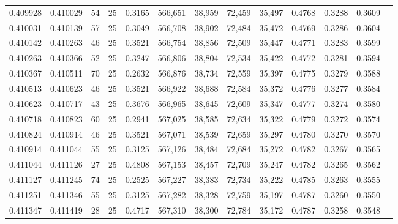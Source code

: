 \begin{tabular}{rrrrrrrrrrrrr}
0.409928 & 0.410029 &    54 &  25 &                                     0.3165 & 566,651 &  38,959 &  72,459 &  35,497 & 0.4768 & 0.3288 & 0.3609 \\
0.410031 & 0.410139 &    57 &  25 &                                     0.3049 & 566,708 &  38,902 &  72,484 &  35,472 & 0.4769 & 0.3286 & 0.3604 \\
0.410142 & 0.410263 &    46 &  25 &                                     0.3521 & 566,754 &  38,856 &  72,509 &  35,447 & 0.4771 & 0.3283 & 0.3599 \\
0.410263 & 0.410366 &    52 &  25 &                                     0.3247 & 566,806 &  38,804 &  72,534 &  35,422 & 0.4772 & 0.3281 & 0.3594 \\
0.410367 & 0.410511 &    70 &  25 &                                     0.2632 & 566,876 &  38,734 &  72,559 &  35,397 & 0.4775 & 0.3279 & 0.3588 \\
0.410513 & 0.410623 &    46 &  25 &                                     0.3521 & 566,922 &  38,688 &  72,584 &  35,372 & 0.4776 & 0.3277 & 0.3584 \\
0.410623 & 0.410717 &    43 &  25 &                                     0.3676 & 566,965 &  38,645 &  72,609 &  35,347 & 0.4777 & 0.3274 & 0.3580 \\
0.410718 & 0.410823 &    60 &  25 &                                     0.2941 & 567,025 &  38,585 &  72,634 &  35,322 & 0.4779 & 0.3272 & 0.3574 \\
0.410824 & 0.410914 &    46 &  25 &                                     0.3521 & 567,071 &  38,539 &  72,659 &  35,297 & 0.4780 & 0.3270 & 0.3570 \\
0.410914 & 0.411044 &    55 &  25 &                                     0.3125 & 567,126 &  38,484 &  72,684 &  35,272 & 0.4782 & 0.3267 & 0.3565 \\
0.411044 & 0.411126 &    27 &  25 &                                     0.4808 & 567,153 &  38,457 &  72,709 &  35,247 & 0.4782 & 0.3265 & 0.3562 \\
0.411127 & 0.411245 &    74 &  25 &                                     0.2525 & 567,227 &  38,383 &  72,734 &  35,222 & 0.4785 & 0.3263 & 0.3555 \\
0.411251 & 0.411346 &    55 &  25 &                                     0.3125 & 567,282 &  38,328 &  72,759 &  35,197 & 0.4787 & 0.3260 & 0.3550 \\
0.411347 & 0.411419 &    28 &  25 &                                     0.4717 & 567,310 &  38,300 &  72,784 &  35,172 & 0.4787 & 0.3258 & 0.3548 \\

\end{tabular}
